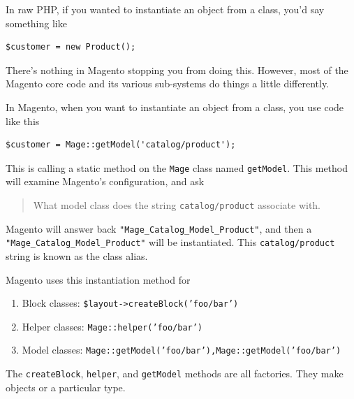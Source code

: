 \documentclass[oneside]{book}
\begin{document}
In raw PHP, if you wanted to instantiate an object from a class, you'd say something like

\begin{lstlisting}
$customer = new Product();

\end{lstlisting}


There's nothing in Magento stopping you from doing this.  However, most of the Magento core code and its various sub-systems do things a little differently.

In Magento, when you want to instantiate an object from a class, you use code like this

\begin{lstlisting}
$customer = Mage::getModel('catalog/product');

\end{lstlisting}


This is calling a static method on the \footnotesize\texttt{Mage} \normalsize  class named \footnotesize\texttt{getModel}\normalsize.  This method will examine Magento's configuration, and ask

\begin{quote}
What model class does the string \footnotesize\texttt{catalog/product} \normalsize  associate with.
\end{quote}

Magento will answer back \footnotesize\texttt{"Mage\_Catalog\_Model\_Product"}\normalsize, and then a \footnotesize\texttt{"Mage\_Catalog\_Model\_Product"} \normalsize  will be instantiated. This \footnotesize\texttt{catalog/product} \normalsize  string is known as the class alias.

Magento uses this instantiation method for

\begin{enumerate}
\item Block classes:  \footnotesize\texttt{\$layout-\textgreater createBlock('foo/bar')} \normalsize
\item Helper classes: \footnotesize\texttt{Mage::helper('foo/bar')} \normalsize
\item Model classes: \footnotesize\texttt{Mage::getModel('foo/bar'),Mage::getModel('foo/bar')} \normalsize
\end{enumerate}


The \footnotesize\texttt{createBlock}\normalsize, \footnotesize\texttt{helper}\normalsize, and \footnotesize\texttt{getModel} \normalsize  methods are all factories.  They make objects or a particular type.
\end{document}
